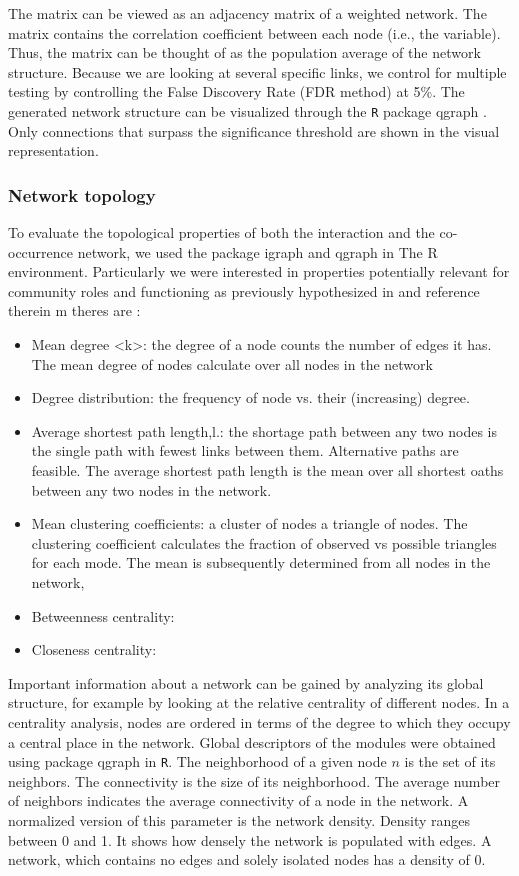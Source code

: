 \documentclass[a4paper]{article}
\begin{document}
The matrix can be viewed as an adjacency matrix of a weighted network. The matrix contains the correlation coefficient between each node (i.e., the variable). Thus, the matrix can be thought of as the population average of the network structure. Because we are looking at several specific links, we control for multiple testing by controlling the False Discovery Rate (FDR method) at 5\%. The generated network structure can be visualized through the \texttt{R} package qgraph \citep{igraph}. Only connections that surpass the significance threshold are shown in the visual representation. 

\subsubsection{Network topology}

To evaluate the topological properties of both the interaction  and the co-occurrence network, we used the package igraph and qgraph in The R environment. Particularly we were interested in properties potentially relevant for community roles and functioning as previously hypothesized in and reference therein m theres are :

\begin{itemize}
\item Mean degree <k>: the degree of a node counts the number of edges it has. The mean degree of nodes calculate over all  nodes in the network
\item Degree distribution: the frequency of node vs. their (increasing) degree.
\item Average shortest path length,l.: the shortage path between any two nodes is the single path with fewest links between them. Alternative paths are feasible. The average shortest path length is the mean over all shortest oaths between any two nodes in the network.
\item Mean clustering coefficients: a cluster of nodes  a triangle of nodes. The clustering coefficient calculates the fraction of observed vs possible triangles for each mode. The mean is subsequently determined from all nodes in the network,
\item Betweenness centrality:
\item Closeness centrality:
\end{itemize}

Important information about a network can be gained by analyzing its global structure, for example by looking at the relative centrality of different nodes. In a centrality analysis, nodes are ordered in terms of the degree to which they occupy a central place in the network. Global descriptors of the modules were obtained using package qgraph in \texttt{R}. The neighborhood of a given node $n$ is the set of its neighbors. The connectivity is the size of its neighborhood. The average number of neighbors indicates the average connectivity of a node in the network. A normalized version of this parameter is the network density. Density ranges between 0 and 1. It shows how densely the network is populated with edges. A network, which contains no edges and solely isolated nodes has a density of 0. 
\end{document}
